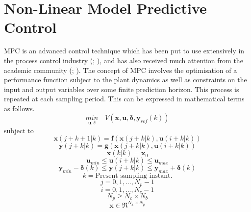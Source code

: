 \documentclass[preprint,authoryear,12pt]{elsarticle}
\begin{document}
\section{Non-Linear Model Predictive Control}\label{sec:NonLinearMPC}
MPC is an advanced control technique which has been put to use extensively in the process control industry (\cite{Forbes2015}; \cite{Qin2003}), and has also received much attention from the academic community (\cite{Camacho1999}; \cite{Mayne2009}). The concept of MPC involves the optimisation of a performance function subject to the plant dynamics as well as constraints on the input and output variables over some finite prediction horizon. This process is repeated at each sampling period. This can be expressed in mathematical terms as follows.
\begin{displaymath}	
\underset{\mathbf{u},\delta}{min}\quad V(\mathbf{x}, \mathbf{u},\boldsymbol{\delta},\mathbf{y}_{ref}(k))
\end{displaymath}
subject to
\begin{displaymath}
\mathbf{x}(j+k+1|k)  = \mathbf{f}(\mathbf{x}(j+k|k),\mathbf{u}(i+k|k))
\end{displaymath}
\begin{displaymath}
\mathbf{y}(j+k|k)  = \mathbf{g}(\mathbf{x}(j+k|k),\mathbf{u}(i+k|k))
\end{displaymath}
\begin{displaymath}
\mathbf{x}(k|k) = \mathbf{x}_0
\end{displaymath}
\begin{displaymath}
\mathbf{u}_{min}\le \mathbf{u}(i+k|k) \le \mathbf{u}_{max} 
\end{displaymath}
\begin{displaymath}
\mathbf{y}_{min}-\boldsymbol{\delta}(k) \le \mathbf{y}(j+k|k) \le \mathbf{y}_{max}+\boldsymbol{\delta}(k) 
\end{displaymath}
\begin{displaymath}
k = \textrm{Present sampling instant.} 
\end{displaymath}
\begin{displaymath}
j = 0,1,..., N_p-1 
\end{displaymath}
\begin{displaymath}
i = 0,1,..., N_c-1
\end{displaymath}
\begin{displaymath}
N_p \ge N_c \times N_b
\end{displaymath}
\begin{displaymath}
\mathbf{x}\in \Re^{N_x \times N_p}
\end{displaymath}
\end{document}
